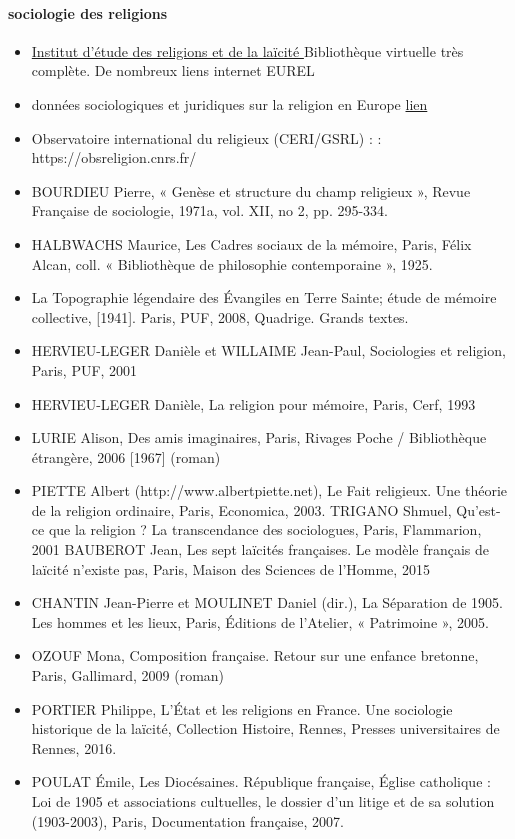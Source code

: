 \paragraph{sociologie des religions}  
\begin{itemize}
\item  \href{https://irel.ephe.psl.eu/institut}{Institut d’étude des religions et de la laïcité  } Bibliothèque virtuelle très complète. De nombreux liens internet EUREL 
\item données sociologiques et juridiques sur la religion en Europe \href{http://eurel.u-strasbg.fr/}{lien}  

\item Observatoire international du religieux (CERI/GSRL) :  : https://obsreligion.cnrs.fr/  
\item BOURDIEU Pierre, « Genèse et structure du champ religieux », Revue Française de   sociologie, 1971a, vol. XII, no 2, pp. 295-334. 
\item HALBWACHS Maurice, Les Cadres sociaux de la mémoire, Paris, Félix Alcan, coll.  « Bibliothèque de philosophie contemporaine », 1925.  
\item   La Topographie légendaire des Évangiles en Terre Sainte; étude de mémoire collective, [1941]. Paris, PUF, 2008,  Quadrige. Grands textes. 
\item HERVIEU-LEGER Danièle et WILLAIME Jean-Paul, Sociologies et religion, Paris, PUF,  2001  
\item HERVIEU-LEGER Danièle, La religion pour mémoire, Paris, Cerf, 1993 
\item LURIE Alison, Des amis imaginaires, Paris,  Rivages Poche / Bibliothèque étrangère,  2006 [1967] (roman) 
\item PIETTE Albert (http://www.albertpiette.net), Le Fait religieux. Une théorie de la religion  ordinaire, Paris, Economica, 2003. TRIGANO Shmuel, Qu’est-ce que la religion ? La transcendance des sociologues, Paris,   Flammarion, 2001  BAUBEROT Jean, Les sept laïcités françaises. Le modèle français de laïcité n'existe pas,  Paris, Maison des Sciences de l'Homme, 2015 
\item CHANTIN Jean-Pierre et MOULINET Daniel (dir.), La Séparation de 1905. Les hommes  et les lieux, Paris, Éditions de l’Atelier, « Patrimoine », 2005. 

\item OZOUF Mona, Composition française. Retour sur une enfance bretonne, Paris,  Gallimard, 2009 (roman) 
\item PORTIER Philippe, L'État et les religions en France. Une sociologie historique de la  laïcité, Collection Histoire, Rennes, Presses universitaires de Rennes, 2016. 
\item POULAT Émile, Les Diocésaines. République française, Église catholique : Loi de  1905 et associations cultuelles, le dossier d'un litige et de sa solution (1903-2003), Paris, Documentation française, 2007.  


\end{itemize}
